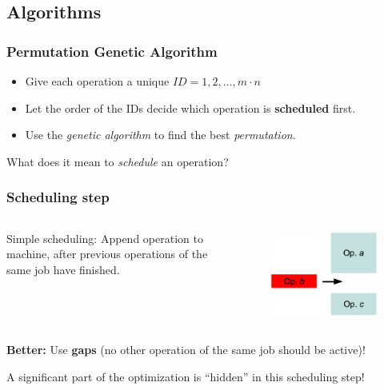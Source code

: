 \subsection{Algorithms}
\begin{frame}
  \frametitle{Permutation Genetic Algorithm\cite{Khuri}}
	
	\begin{idea}
	
	
	\begin{itemize}
	
		\item Give each operation a unique $ID = 1,2,\dots, m \cdot n$

		\item 	Let the order of the IDs decide which operation is \textbf{scheduled} first.

		\item 	Use the \emph{genetic algorithm} to find the best \emph{permutation}.
	\end{itemize}
	
	\end{idea}
	
	\pause
	
	What does it mean to \emph{schedule} an operation?  

\end{frame}

\begin{frame}
  \frametitle{Scheduling step}
	
	
	\small
	\begin{columns}	
Simple scheduling: Append operation to machine, after previous operations of the same job have finished.



	\begin{figure}
		\includegraphics[width=.6\linewidth]{images/scheduling.png}

	\end{figure}
	
\end{columns}

\textbf{Better:} Use \textbf{gaps} (no other operation of the same job should be active)!

	A significant part of the optimization is ``hidden'' in this scheduling step!

\end{frame}

